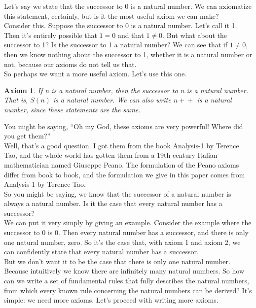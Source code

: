 \documentclass{article}
\newtheorem{axiom}{Axiom}
\newcommand{\inc}[1]{#1\!+\!+}
\begin{document}
Let's say we state that the successor to 0 is a natural number. We can axiomatize this statement, certainly, but is it the most useful axiom we can make? \\

Consider this. Suppose the successor to 0 is a natural number. Let's call it 1. Then it's entirely possible that $1 = 0$ and that $1 \neq 0$. But what about the successor to 1? Is the successor to 1 a natural number? We can see that if $1 \neq 0$, then we know nothing about the successor to 1, whether it is a natural number or not, because our axioms do not tell us that. \\

So perhaps we want a more useful axiom. Let's use this one. 

\begin{axiom}
If n is a natural number, then the successor to n is a natural number. That is, $S(n)$ is a natural number. We can also write $\inc{n}$ is a natural number, since these statements are the same.
\end{axiom}

You might be saying, ``Oh my God, these axioms are very powerful! Where did you get them?'' \\

Well, that's a good question. I got them from the book Analysis-1 by Terence Tao, and the whole world has gotten them from a 19th-century Italian mathematician named Giuseppe Peano. The formulation of the Peano axioms differ from book to book, and the formulation we give in this paper comes from Analysis-1 by Terence Tao. \\

So you might be saying, we know that the successor of a natural number is always a natural number. Is it the case that every natural number has a successor? \\

We can put it very simply by giving an example. Consider the example where the successor to 0 is 0. Then every natural number has a successor, and there is only one natural number, zero. So it's the case that, with axiom 1 and axiom 2, we can confidently state that every natural number has a successor. \\

But we don't want it to be the case that there is only one natural number. Because intuitively we know there are infinitely many natural numbers. So how can we write a set of fundamental rules that fully describes the natural numbers, from which every known rule concerning the natural numbers can be derived? It's simple: we need more axioms. Let's proceed with writing more axioms.
\end{document}
